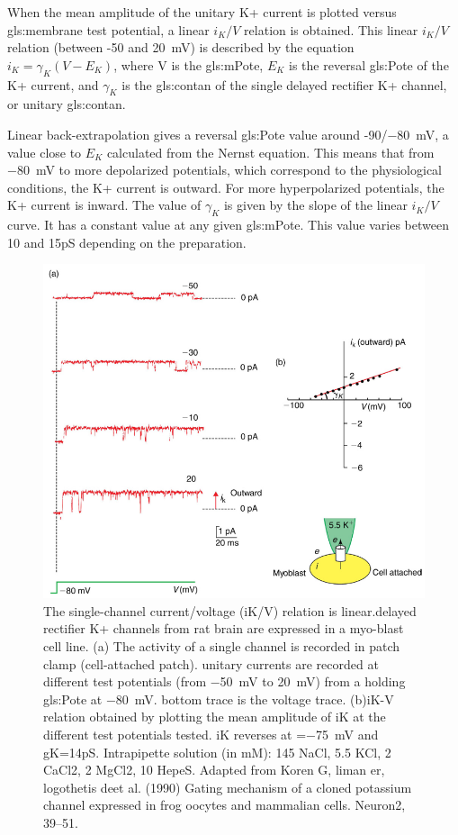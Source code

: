 \documentclass[class={myRUCProject}, crop=false]{standalone}
\begin{document}
When the mean amplitude of the unitary K+ current is plotted versus \gls{gls:membrane} test potential, a linear \(i_K/V\) relation is obtained. This linear \(i_K/V\) relation (between -50 and \qty{20}{\mV}) is described by the equation \(i_K = \gamma_K(V-E_K)\), where V is the \gls{gls:mPote}, \(E_K\) is the reversal \gls{gls:Pote} of the K+ current, and \(\gamma_K\) is the \gls{gls:contan} of the single delayed rectifier K+ channel, or unitary \gls{gls:contan}. 

Linear back-extrapolation gives a reversal \gls{gls:Pote} value around -90/\qty{-80}{\mV}, a value close to \(E_K\) calculated from the Nernst equation. This means that from \qty{-80}{\mV} to more depolarized potentials, which correspond to the physiological conditions, the K+ current is outward. For more hyperpolarized potentials, the K+ current is inward. The value of \(\gamma_K\) is given by the slope of the linear \(i_K/V\)curve. It has a constant value at any given \gls{gls:mPote}. This value varies between 10 and 15pS depending on the preparation. 

\begin{figure}[H]
   \centering
   \includegraphics[width=0.5\linewidth]{Pictures//Anakin/I-V.K.png}
   \caption{The single-channel current/voltage (iK/V) relation is linear.delayed rectifier K+ channels from rat brain are expressed in a myo-blast cell line. (a) The activity of a single channel is recorded in patch clamp (cell-attached patch). unitary currents are recorded at different test potentials (from \qty{-50}{\mV} to \qty{20}{\mV}) from a holding \gls{gls:Pote} at \qty{-80}{\mV}. bottom trace is the voltage trace. (b)iK-V relation obtained by plotting the mean amplitude of iK at the different test potentials tested. iK reverses at =\qty{-75}{\mV} and gK=14pS. Intrapipette solution (in mM): 145 NaCl, 5.5 KCl, 2 CaCl2, 2 MgCl2, 10 HepeS. Adapted from Koren G, liman er, logothetis deet al. (1990) Gating mechanism of a cloned potassium channel expressed in frog oocytes and mammalian cells. Neuron2, 39–51.}
   \label{fig:enter-label}
 \end{figure} 
\end{document}
